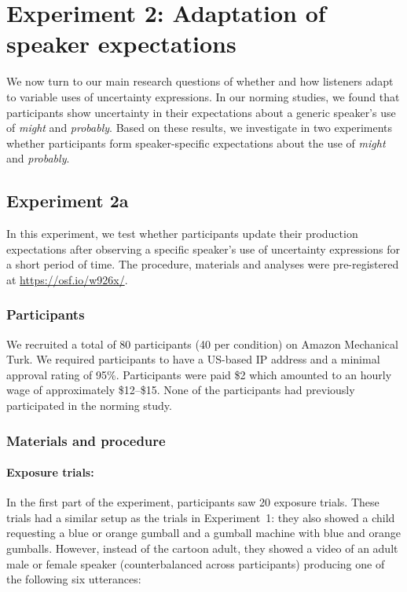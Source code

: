 \documentclass[man, floatsintext]{apa6}
\begin{document}
\section{Experiment 2: Adaptation of speaker expectations}
\label{sec:exp-prod-adaptation}

We now turn to our main research questions of whether and how listeners adapt to variable uses of uncertainty expressions.
In our norming studies, we found that participants show uncertainty in their expectations about a generic speaker's 
use of \textit{might} and \textit{probably}. Based on these results, we investigate in two experiments whether participants
form speaker-specific expectations about the use of \textit{might} and \textit{probably}.

\subsection{Experiment 2a}
In this experiment, we test whether participants update their production expectations after observing a specific speaker's use of 
uncertainty expressions for a short period of time. The procedure, materials and analyses were pre-registered at \url{https://osf.io/w926x/}.


\subsubsection{Participants}
We recruited a total of 80 participants (40 per condition) on Amazon Mechanical Turk. 
We required participants to have a US-based IP address and a minimal approval rating 
of 95\%. Participants were paid \$2 which amounted to an hourly wage of approximately 
\$12--\$15. None of the participants had previously participated in the norming study.

\subsubsection{Materials and procedure}

\paragraph{Exposure trials:} In the first part of the experiment, participants saw 20 exposure trials. 
These trials had a similar setup as the trials in Experiment~1: 
they also showed a child requesting a blue or orange gumball and a gumball machine with blue and orange gumballs. 
However, instead of the cartoon adult, they showed a video of an adult male or female speaker (counterbalanced across participants) producing one of the following six utterances:
\end{document}
